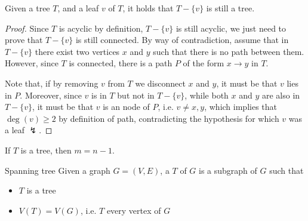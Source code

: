 \documentclass[a4paper, 12pt]{report}
\begin{document}
    \begin{framedlem}[label={tree without leaf}]{}
        Given a tree $T$, and a leaf $v$ of $T$, it holds that $T - \{v\}$ is still a tree.
    \end{framedlem}

    \begin{proof}
        Since $T$ is acyclic by definition, $T - \{v\}$ is still acyclic, we just need to prove that $T - \{v\}$ is still connected. By way of contradiction, assume that in $T - \{v\}$ there exist two vertices $x$ and $y$ such that there is no path between them. However, since $T$ is connected, there is a path $P$ of the form $x \to y$ in $T$.

        Note that, if by removing $v$ from $T$ we disconnect $x$ and $y$, it must be that $v$ lies in $P$. Moreover, since $v$ is in $T$ but not in $T - \{v\}$, while both $x$ and $y$ are also in $T - \{v\}$, it must be that $v$ is an  node of $P$, i.e. $v \neq x, y$, which implies that $\deg(v) \ge 2$ by definition of path, contradicting the hypothesis for which $v$ was a leaf $\lightning$.
    \end{proof}

    \begin{framedprop}[label={m n - 1}]{}
        If $T$ is a tree, then $m = n - 1$.
    \end{framedprop}


    \begin{frameddefn}{Spanning tree}
        Given a graph $G = (V, E)$, a  $T$ of $G$ is a subgraph of $G$ such that

        \begin{itemize}
            \item $T$ is a tree
            \item $V(T) = V(G)$, i.e. $T$  every vertex of $G$
        \end{itemize}
    \end{frameddefn}
\end{document}
